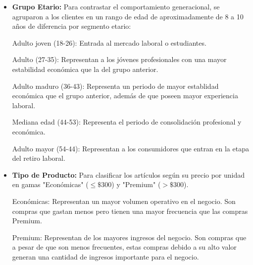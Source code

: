 \documentclass[oneside,11pt]{Latex/Classes/PhDthesisPSnPDF}
\begin{document}
\begin{itemize}
\item \textbf{Grupo Etario:} Para contrastar el comportamiento generacional, se agruparon a los clientes en un rango de edad de aproximadamente de 8 a 10 años de diferencia por segmento etario: 

Adulto joven (18-26): Entrada al mercado laboral o estudiantes.

Adulto (27-35): Representan a los jóvenes profesionales con una mayor estabilidad económica que la del grupo anterior.

Adulto maduro (36-43): Representa un periodo de mayor establidad económica que el grupo anterior, además de que poseen mayor experiencia laboral.

Mediana edad (44-53): Representa el periodo de consolidación profesional y económica.

Adulto mayor (54-44): Representan a los consumidores que entran en la etapa del retiro laboral.

\item \textbf{Tipo de Producto:} Para clasificar los artículos según su precio por unidad en gamas "Económicas" ($\leq \$300$) y "Premium" ($> \$300$).

Económicas: Representan un mayor volumen operativo en el negocio. Son compras que gastan menos pero tienen una mayor frecuencia que las compras Premium.

Premium: Representan de los mayores ingresos del negocio. Son compras que a pesar de que son menos frecuentes, estas compras debido a su alto valor generan una cantidad de ingresos importante para el negocio.

\end{itemize}
\end{document}
